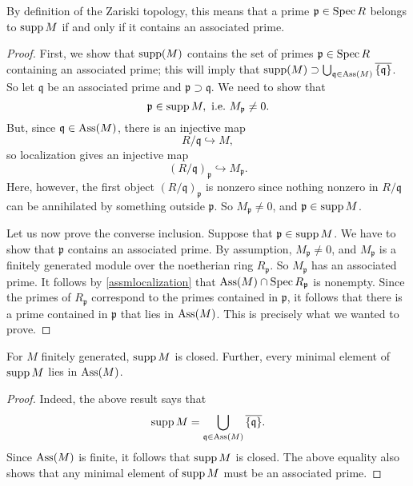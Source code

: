 By definition of the Zariski topology, this means that a prime $\mathfrak{p}
\in \operatorname{Spec} R$ belongs to $\operatorname{supp} M$ if and only if it contains an associated
prime. 

\begin{proof} 
First,  we show that $\operatorname{supp}(M)$ contains the set of primes
$\mathfrak{p} \in \operatorname{Spec} R$ containing an associated prime; this will imply
that $\operatorname{supp}(M) \supset \bigcup_{\mathfrak{q} \in \operatorname{Ass}(M)}
\overline{\left\{\mathfrak{q}\right\}}$. So let $\mathfrak{q}$ be an
associated prime and $\mathfrak{p} \supset \mathfrak{q}$. We need to show that
\[ \mathfrak{p} \in \operatorname{supp} M, \ \text{i.e.} \ M_{\mathfrak{p}} \neq 0.  \]
But, since $\mathfrak{q} \in \operatorname{Ass}(M)$,  there is an injective map
\[ R/\mathfrak{q} \hookrightarrow M , \]
so localization gives an injective map
\[ (R/\mathfrak{q})_{\mathfrak{p}} \hookrightarrow M_{\mathfrak{p}}.  \]
Here, however, the first object $(R/\mathfrak{q})_{\mathfrak{p}}$ is nonzero since nothing nonzero in $R/\mathfrak{q}$ can be
annihilated by something outside $\mathfrak{p}$. So $M_{\mathfrak{p}} \neq
0$, and $\mathfrak{p} \in \operatorname{supp} M$. 

Let us now prove the converse inclusion. Suppose that $\mathfrak{p} \in \operatorname{supp} M$. We
have to show that $\mathfrak{p}$ contains an associated prime.  
By assumption, $M_{\mathfrak{p}} \neq 0$, and $M_{\mathfrak{p}}$ is a finitely generated
module over the noetherian ring $R_{\mathfrak{p}}$. So $M_{\mathfrak{p}}$ has
an associated prime.
It follows by \cref{assmlocalization} that $\operatorname{Ass}(M) \cap \operatorname{Spec}
R_{\mathfrak{p}}$ is nonempty. Since the primes of $R_{\mathfrak{p}}$
correspond to the primes contained in $\mathfrak{p}$, it follows that there
is  a prime contained in $\mathfrak{p}$ that lies in $\operatorname{Ass}(M)$. This is
precisely what we wanted to prove.
\end{proof} 


\begin{corollary} \label{suppisclosed} For $M$ finitely generated,  
$\operatorname{supp} M$ is closed. Further, every minimal element of $\operatorname{supp} M$ lies in
$\operatorname{Ass}(M)$.
\end{corollary} 
\begin{proof} 
Indeed, the above result says that
\[ \operatorname{supp} M  = \bigcup_{\mathfrak{q} \in \operatorname{Ass}(M)}
\overline{\left\{\mathfrak{q}\right\}}. \]
Since $\operatorname{Ass}(M)$ is finite, it follows that $\operatorname{supp} M$ is closed.
The above equality also shows that any minimal element of $\operatorname{supp} M$ must be an
associated prime.
\end{proof} 


